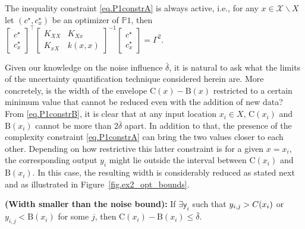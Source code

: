 \begin{proposition} 
	\label{prop.complex_constraint_always_active}
	The inequality constraint \eqref{eq.P1constrA} is always active, i.e., for any $x \in \mathcal{X} \backslash X $ let $(c^\star,c_x^\star)$ be an optimizer of $\mathds{P}1$, then $\begin{bmatrix}
		c ^\star\\
		c_x^\star
	\end{bmatrix}^\top 
	\begin{bmatrix}
		K_{XX} & K_{Xx} \\
		K_{xX} & k(x,x)
	\end{bmatrix}^{-1} 
	\begin{bmatrix}
		c^\star \\
		c_x^\star
	\end{bmatrix} = \Gamma^2 $. 
\end{proposition}

Given our knowledge on the noise influence $\bar \delta$, it is natural to ask what the limits of the uncertainty quantification technique considered herein are. More concretely, is the width of the envelope $\text{C}(x) - \text{B}(x)$ restricted to a certain minimum value that cannot be reduced even with the addition of new data? From \eqref{eq.P1constrB}, it is clear that at any input location $x_i \in X$, $\text{C}(x_i)$ and $\text{B}(x_i)$ cannot be more than $2\bar \delta$ apart. In addition to that, the presence of the complexity constraint \eqref{eq.P1constrA} can bring the two values closer to each other. Depending on how restrictive this latter constraint is for a given $x = x_i$, the corresponding output $y_i$ might lie outside the interval between $\text{C}(x_i)$ and $\text{B}(x_i)$. In this case, the resulting width is considerably reduced as stated next and as illustrated in Figure~\ref{fig.ex2_opt_bounds}.

\begin{proposition} 
	\label{prop.smallWidth}
	{\normalfont \textbf{(Width smaller than the noise bound):}}
	If $\exists \mathsf{y}_i$ such that $y_{i,j} > {\normalfont C}(x_i)$ or $y_{i,j} < \text{B}(x_i)$ for some $j$, then $\text{C}(x_i) - \text{B}(x_i) \leq \bar \delta$.
\end{proposition}

